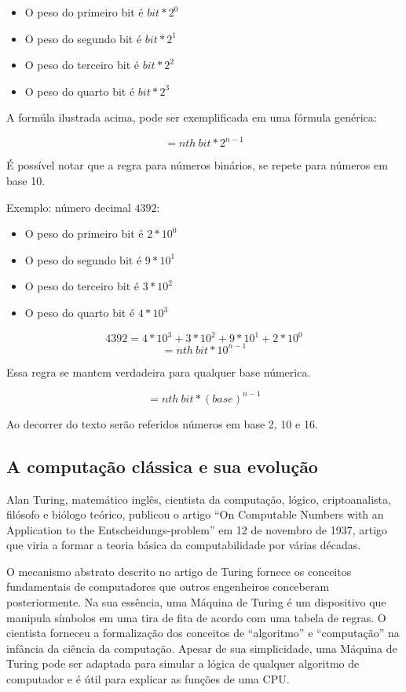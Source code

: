 \begin{itemize}
  \item O peso do primeiro bit é $bit * 2^0$
  \item O peso do segundo bit é $bit * 2^1$
  \item O peso do terceiro bit é $bit * 2^2$
  \item O peso do quarto bit é $bit * 2^3$
\end{itemize}

A formúla ilustrada acima, pode ser exemplificada em uma fórmula genérica: 

\[= nth\: bit * 2^{n-1}\]

É possível notar que a regra para números binários, se repete para números em base 10.

Exemplo: número decimal $4392$:
\begin{itemize}
  \item O peso do primeiro bit é $2 * 10^0$
  \item O peso do segundo bit é $9 * 10^1$
  \item O peso do terceiro bit é $3 * 10^2$
  \item O peso do quarto bit é $4 * 10^3$
\end{itemize}
\[ 4392 = 4*10^3 + 3*10^2 + 9*10^1 + 2*10^0\]
\[= nth\: bit * 10^{n-1}\]

Essa regra se mantem verdadeira para qualquer base númerica.

\[= nth\: bit * (base)^{n-1}\]

Ao decorrer do texto serão referidos números em base 2, 10 e 16. 

\subsection{A computação clássica e sua evolução}
Alan Turing, matemático inglês, cientista da computação, lógico, criptoanalista, filósofo e biólogo teórico, publicou o artigo “On Computable Numbers with an Application to the Entscheidungs-problem” \cite{8} em 12 de novembro de 1937, artigo que viria a formar a teoria básica da computabilidade por várias décadas.

O mecanismo abstrato descrito no artigo de Turing fornece os conceitos fundamentais de computadores que outros engenheiros conceberam posteriormente. Na sua essência, uma Máquina de Turing é um dispositivo que manipula símbolos em uma tira de fita de acordo com uma tabela de regras. O cientista forneceu a formalização dos conceitos de “algoritmo” e “computação” na infância da ciência da computação. Apesar de sua simplicidade, uma Máquina de Turing pode ser adaptada para simular a lógica de qualquer algoritmo de computador e é útil para explicar as funções de uma CPU.

